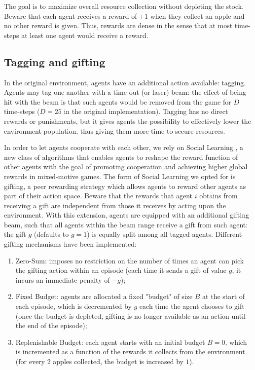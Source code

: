 \documentclass{article}
\begin{document}
The goal is to maximize overall resource collection without depleting the stock. Beware that each agent receives a reward of $+1$ when they collect an apple and no other reward is given. Thus, rewards are dense in the sense that at most time-steps at least one agent would receive a reward.

\subsection{Tagging and gifting}
In the original environment, agents have an additional action available: tagging. Agents may tag one another with a time-out (or laser) beam: the effect of being hit with the beam is that such agents would be removed from the game for $D$ time-steps ($D=25$ in the original implementation). Tagging has no direct rewards or punishments, but it gives agents the possibility to effectively lower the environment population, thus giving them more time to secure resources.

In order to let agents cooperate with each other, we rely on Social Learning \cite{social-learning}, a new class of algorithms that enables agents to reshape the reward function of other agents with the goal of promoting cooperation and achieving higher global rewards in mixed-motive games. The form of Social Learning we opted for is gifting, a peer rewarding strategy which allows agents to reward other agents as part of their action space. Beware that the rewards that agent $i$ obtains from receiving a gift are independent from those it receives by acting upon the environment. With this extension, agents are equipped with an additional gifting beam, such that all agents within the beam range receive a gift from such agent: the gift $g$ (defaults to $g=1$) is equally split among all tagged agents. Different gifting mechanisms have been implemented:
\begin{enumerate}
  \item Zero-Sum: imposes no restriction on the number of times an agent can pick the gifting action within an episode (each time it sends a gift of value $g$, it incurs an immediate penalty of $-g$);
  \item Fixed Budget: agents are allocated a fixed "budget" of size $B$ at the start of each episode, which is decremented by $g$ each time the agent chooses to gift (once the budget is depleted, gifting is no longer available as an action until the end of the episode);
  \item Replenishable Budget: each agent starts with an initial budget $B = 0$, which is incremented as a function of the rewards it collects from the environment (for every $2$ apples collected, the budget is increased by $1$).
\end{enumerate}
\end{document}
